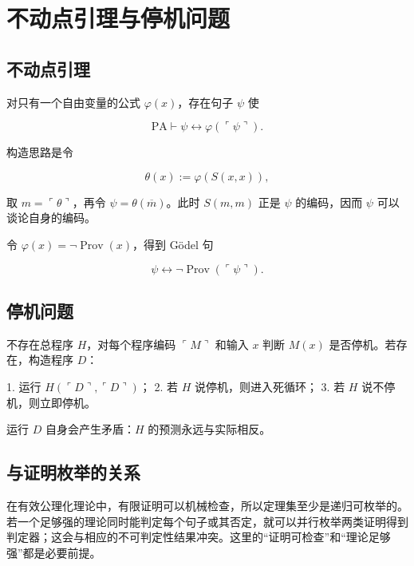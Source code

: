 \section{不动点引理与停机问题}


\subsection{不动点引理}


对只有一个自由变量的公式 $\varphi(x)$，存在句子 $\psi$ 使

\[
\mathrm{PA}\vdash\psi\leftrightarrow\varphi(\ulcorner\psi\urcorner).
\]

构造思路是令

\[
\theta(x):=\varphi(S(x,x)),
\]

取 $m=\ulcorner\theta\urcorner$，再令 $\psi=\theta(\overline m)$。此时 $S(m,m)$ 正是 $\psi$ 的编码，因而 $\psi$ 可以谈论自身的编码。

令 $\varphi(x)=\neg\operatorname{Prov}(x)$，得到 Gödel 句

\[
\psi\leftrightarrow\neg\operatorname{Prov}(\ulcorner\psi\urcorner).
\]

\subsection{停机问题}


不存在总程序 $H$，对每个程序编码 $\ulcorner M\urcorner$ 和输入 $x$ 判断 $M(x)$ 是否停机。若存在，构造程序 $D$：

1. 运行 $H(\ulcorner D\urcorner,\ulcorner D\urcorner)$；
2. 若 $H$ 说停机，则进入死循环；
3. 若 $H$ 说不停机，则立即停机。

运行 $D$ 自身会产生矛盾：$H$ 的预测永远与实际相反。

\subsection{与证明枚举的关系}


在有效公理化理论中，有限证明可以机械检查，所以定理集至少是递归可枚举的。若一个足够强的理论同时能判定每个句子或其否定，就可以并行枚举两类证明得到判定器；这会与相应的不可判定性结果冲突。这里的“证明可检查”和“理论足够强”都是必要前提。
